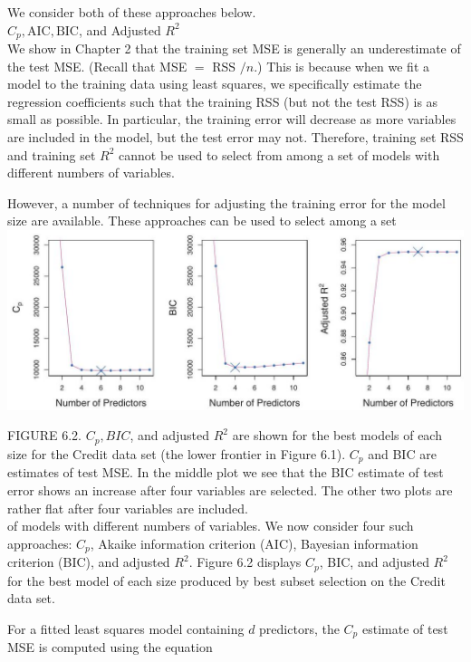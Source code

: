 \documentclass[10pt]{article}
\begin{document}
We consider both of these approaches below.\\
$C_{p}, \mathrm{AIC}, \mathrm{BIC}$, and Adjusted $R^{2}$\\
We show in Chapter 2 that the training set MSE is generally an underestimate of the test MSE. (Recall that MSE $=$ RSS $/ n$.) This is because when we fit a model to the training data using least squares, we specifically estimate the regression coefficients such that the training RSS (but not the test RSS) is as small as possible. In particular, the training error will decrease as more variables are included in the model, but the test error may not. Therefore, training set RSS and training set $R^{2}$ cannot be used to select from among a set of models with different numbers of variables.

However, a number of techniques for adjusting the training error for the model size are available. These approaches can be used to select among a set\\
\includegraphics[max width=\textwidth, center]{2025_05_05_efe77898333945044de4g-226}

FIGURE 6.2. $C_{p}, B I C$, and adjusted $R^{2}$ are shown for the best models of each size for the Credit data set (the lower frontier in Figure 6.1). $C_{p}$ and BIC are estimates of test MSE. In the middle plot we see that the BIC estimate of test error shows an increase after four variables are selected. The other two plots are rather flat after four variables are included.\\
of models with different numbers of variables. We now consider four such approaches: $C_{p}$, Akaike information criterion (AIC), Bayesian information criterion (BIC), and adjusted $R^{2}$. Figure 6.2 displays $C_{p}$, BIC, and adjusted $R^{2}$ for the best model of each size produced by best subset selection on the Credit data set.

For a fitted least squares model containing $d$ predictors, the $C_{p}$ estimate of test MSE is computed using the equation
\end{document}
